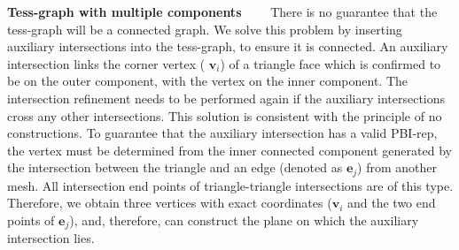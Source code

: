 \vspace{0.5em}
\noindent\textbf{Tess-graph with multiple components}~~~~
There is no guarantee that the tess-graph will be a connected graph. We solve this problem by inserting auxiliary intersections into the tess-graph, to ensure it is connected. An auxiliary intersection links the corner vertex ( $\bm{v}_i$) of a triangle face which is confirmed to be on the outer component, with the vertex on the inner component. The intersection refinement needs to be performed again if the auxiliary intersections cross any other intersections. This solution is consistent with the principle of no constructions. To guarantee that the auxiliary intersection has a valid PBI-rep, the vertex must be determined from the inner connected component generated by the intersection between the triangle and an edge (denoted as $\bm{e}_j$) from another mesh. All intersection end points of triangle-triangle intersections are of this type. Therefore, we obtain three vertices with exact coordinates ($\bm{v}_i$ and the two end points of $\bm{e}_j$), and, therefore, can construct the plane on which the auxiliary intersection lies.

